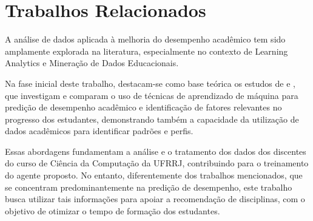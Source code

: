 \section{Trabalhos Relacionados}
A análise de dados aplicada à melhoria do desempenho acadêmico tem sido amplamente explorada na literatura, especialmente no contexto de Learning Analytics e Mineração de Dados Educacionais. 

Na fase inicial deste trabalho, destacam-se como base te\'orica os
estudos de \citet{nachouki2023randomforest} e \citet{asif2017analyzing}, que
investigam e comparam o uso de t\'ecnicas de aprendizado de m\'aquina
para predi\c{c}\~ao de desempenho acad\^emico e identificação de fatores relevantes no progresso dos estudantes, demonstrando também a capacidade da utilização de dados acadêmicos para identificar padrões e perfis.

Essas abordagens fundamentam a análise e o tratamento dos dados dos discentes do curso de Ciência da Computação da UFRRJ, contribuindo para o treinamento do agente proposto. No entanto, diferentemente dos trabalhos mencionados, que se concentram predominantemente na predição de desempenho, este trabalho busca utilizar tais informações para apoiar a recomendação de disciplinas, com o objetivo de otimizar o tempo de formação dos estudantes.
